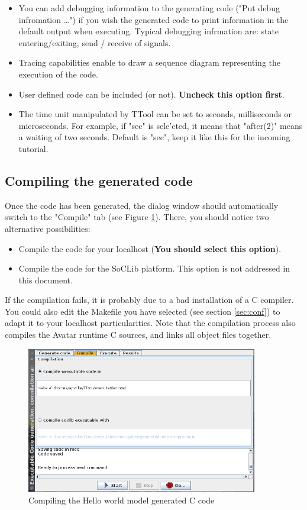 \documentclass[12pt]{article}
\begin{document}
\begin{itemize}
\item You can add debugging information to the generating code ("Put debug infromation \ldots") if you wish the generated code to print information in the default output when executing. Typical debugging infrmation are: state entering/exiting, send / receive of signals.
\item Tracing capabilities enable to draw a sequence diagram representing the execution of the code.
\item User defined code can be included (or not). \textbf{Uncheck this option first}.
\item The time unit manipulated by TTool can be set to seconds, milliseconds or microseconds. For example, if "sec" is sele'cted, it means that  "after(2)" means a waiting of two seconds. Default is "sec", keep it like this for the incoming tutorial.
\end{itemize}

\subsection{Compiling the generated code}
Once the code has been generated, the dialog window should automatically switch to the "Compile" tab (see Figure \ref{fig:compilehelloworld}). There, you should notice two alternative possibilities:
\begin{itemize}
\item Compile the code for your localhost (\textbf{You should select this option}).
\item Compile the code for the SoCLib platform. This option is not addressed in this document.
\end{itemize}
If the compilation fails, it is probably due to a bad installation of a C compiler. You could also edit the Makefile you have selected (see section \ref{sec:conf}) to adapt it to your localhost particularities.  Note that the compilation process also compiles the Avatar runtime C sources, and links all object files together.

\begin{figure}[htbp]
\centering
\includegraphics[width=0.9\textwidth]{figures/compilehelloworld}
\caption{Compiling the Hello world model generated C code} \label{fig:compilehelloworld}
\end{figure}
\end{document}
